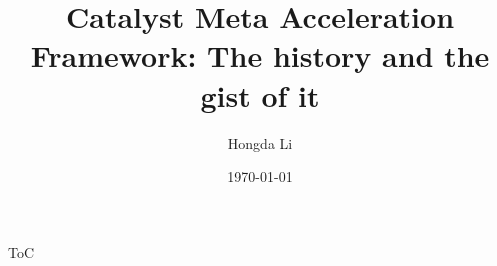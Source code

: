 \documentclass[11pt]{beamer}
\title[Catalyst Acceleration]{Catalyst Meta Acceleration Framework: The history and the gist of it}
\author{Hongda Li}
\institute[]{UBC Okanagan}
\date{\today}
\begin{document}
\begin{frame}
    \titlepage
\end{frame}

\begin{frame}{ToC}
    \begin{multicols}{2}
        \tableofcontents
    \end{multicols}
\end{frame}

\end{document}
